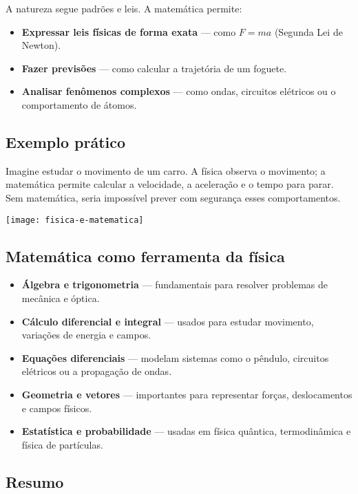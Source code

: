 \documentclass[portuguese,11pt,a4paper,oneside, openany]{article}
\begin{document}
	A natureza segue padrões e leis. A matemática permite:
	
	\begin{itemize}
		\item \textbf{Expressar leis físicas de forma exata} — como $F = m a$ (Segunda Lei de Newton).
		\item \textbf{Fazer previsões} — como calcular a trajetória de um foguete.
		\item \textbf{Analisar fenômenos complexos} — como ondas, circuitos elétricos ou o comportamento de átomos.
	\end{itemize}
	
	\subsection*{Exemplo prático}
	
	Imagine estudar o movimento de um carro. A física observa o movimento; a matemática permite calcular a velocidade, a aceleração e o tempo para parar. Sem matemática, seria impossível prever com segurança esses comportamentos.
	
	\begin{center}
		\texttt{[image: fisica-e-matematica]}
	\end{center}
	
	\subsection*{Matemática como ferramenta da física}
	
	\begin{itemize}
		\item \textbf{Álgebra e trigonometria} — fundamentais para resolver problemas de mecânica e óptica.
		\item \textbf{Cálculo diferencial e integral} — usados para estudar movimento, variações de energia e campos.
		\item \textbf{Equações diferenciais} — modelam sistemas como o pêndulo, circuitos elétricos ou a propagação de ondas.
		\item \textbf{Geometria e vetores} — importantes para representar forças, deslocamentos e campos físicos.
		\item \textbf{Estatística e probabilidade} — usadas em física quântica, termodinâmica e física de partículas.
	\end{itemize}
	
	\subsection*{Resumo}
	
\end{document}
